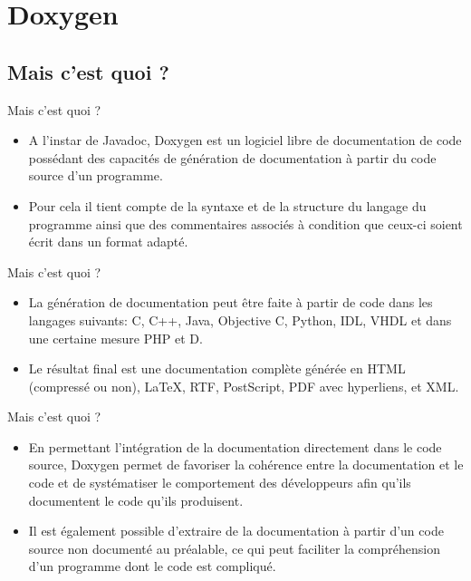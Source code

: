 \documentclass{beamer}
\begin{document}
\section{Doxygen}

\subsection{Mais c'est quoi ?}
\begin{frame}{Mais c'est quoi ?}
 \begin{itemize}
  \item {
   A l'instar de Javadoc, Doxygen est un logiciel libre de documentation de code possédant des capacités de génération de documentation à partir du code source d'un programme. 
  }
  \item {
    Pour cela il tient compte de la syntaxe et de la structure du langage du programme ainsi que des commentaires associés à condition que ceux-ci soient écrit dans un format adapté. 
  }
  \end{itemize}
\end{frame}
\begin{frame}{Mais c'est quoi ?}
\begin{itemize}
    \item {
   La génération de documentation peut être faite à partir de code dans les langages suivants: C, C++, Java, Objective C, Python, IDL, VHDL et dans une certaine mesure PHP et D. 
    }
    \item{
    Le résultat final est une documentation complète générée en HTML (compressé ou non), LaTeX, RTF, PostScript, PDF avec hyperliens, et XML.
    }
    
\end{itemize}
\end{frame}

\begin{frame}{Mais c'est quoi ?}
\begin{itemize}
    \item {
   En permettant l'intégration de la documentation directement dans le code source, Doxygen permet de favoriser la cohérence entre la documentation et le code et de systématiser le comportement des développeurs afin qu'ils documentent le code qu'ils produisent.
    }
    \item{
  Il est également possible d'extraire de la documentation à partir d’un code source non documenté au préalable, ce qui peut faciliter la compréhension d'un programme dont le code est compliqué.
    }
    
\end{itemize}
\end{frame}
\end{document}
